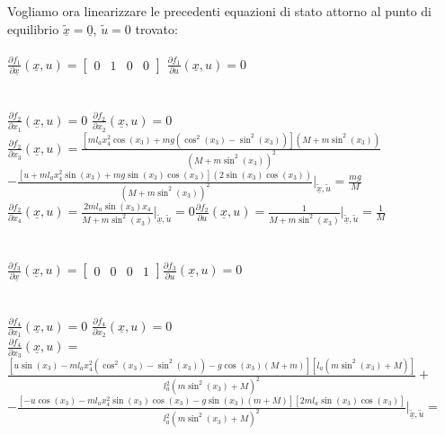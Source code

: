 Vogliamo ora linearizzare le precedenti equazioni di stato attorno al punto di equilibrio $\underline{\tilde{x}}=\underline{0}$, $\tilde{u}=0$ trovato: \\\\
$\displaystyle\frac{\partial{f_1}}{\partial{\underline{x}}}(\underline x,u)=
\begin{bmatrix}
0&1&0&0
\end{bmatrix}$\qquad
$\displaystyle\frac{\partial{f_1}}{\partial{u}}(\underline{x},u)=0$\\\\\\
$\displaystyle\frac{\partial{f_2}}{\partial{x_1}}(\underline{x},u)=0$\qquad
$\displaystyle\frac{\partial{f_2}}{\partial{x_2}}(\underline{x},u)=0$\\
$\displaystyle\frac{\partial{f_2}}{\partial{x_3}}(\underline{x},u)=\displaystyle\frac{[ml_ax_4^2\cos(x_3)+mg(\cos^2(x_3)-\sin^2(x_3))](M+m\sin^2(x_3))}{(M+m\sin^2(x_3))^2}$\\
$-\displaystyle\frac{[u+ml_ax_4^2\sin(x_3)+mg\sin(x_3)\cos(x_3)](2\sin(x_3)\cos(x_3))}{(M+m\sin^2(x_3))^2}\bigg|_{\underline{\tilde{x}},\tilde{u}}=\displaystyle\frac{mg}{M}$\\ $\displaystyle\frac{\partial{f_2}}{\partial{x_4}}(\underline{x},u)=\displaystyle\frac{2ml_a\sin(x_3)x_4}{M+m\sin^2(x_3)}\bigg|_{\underline{\tilde{x}},\tilde{u}}=0$\quad$\displaystyle\frac{\partial{f_2}}{\partial{u}}(\underline{x},u)=\displaystyle\frac{1}{M+m\sin^2(x_3)}\bigg|_{\underline{\tilde{x}},\tilde{u}}=\displaystyle\frac{1}{M}$\\\\\\
$\displaystyle\frac{\partial{f_3}}{\partial{\underline{x}}}(\underline x,u)=
\begin{bmatrix}
0&0&0&1
\end{bmatrix}$\qquad$\displaystyle\frac{\partial{f_3}}{\partial{u}}(\underline{x},u)=0$\\\\\\
$\displaystyle\frac{\partial{f_4}}{\partial{x_1}}(\underline{x},u)=0$\qquad
$\displaystyle\frac{\partial{f_4}}{\partial{x_2}}(\underline{x},u)=0$\\
$\displaystyle\frac{\partial{f_4}}{\partial{x_3}}(\underline{x},u)=$\\$\displaystyle\frac{[u\sin(x_3)-ml_ax_4^2(\cos^2(x_3)-\sin^2(x_3))-g\cos(x_3)(M+m)][l_a(m\sin^2(x_3)+M)]}{l_a^2(m\sin^2(x_3)+M)^2}+$ $-\displaystyle\frac{[-u\cos(x_3)-ml_ax^2_4\sin(x_3)\cos(x_3)-g\sin(x_3)(m+M)][2ml_a\sin(x_3)\cos(x_3)]}{l_a^2(m\sin^2(x_3)+M)^2}\bigg|_{\underline{\tilde{x}},\tilde{u}}=$
